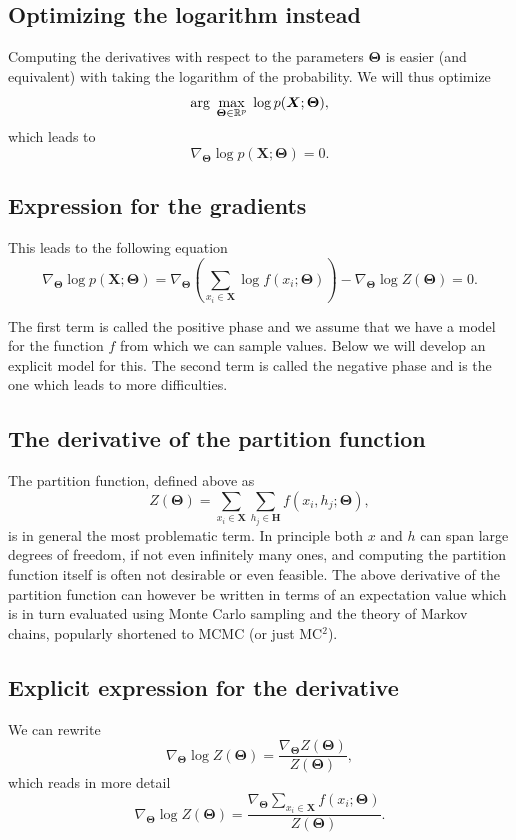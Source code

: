 \documentclass[%
oneside,                 %
final,                   %
10pt]{article}
\begin{document}
\subsection*{Optimizing the logarithm instead}

Computing the derivatives with respect to the parameters $\bm{\Theta}$ is
easier (and equivalent) with taking the logarithm of the
probability. We will thus optimize
\[
{\displaystyle \mathrm{arg} \hspace{0.1cm}\max_{\bm{\bm{\Theta}}\in {\mathbb{R}}^{p}}} \hspace{0.1cm}\log{p(\bm{X};\bm{\Theta})},
\]
which leads to
\[
\nabla_{\bm{\Theta}}\log{p(\bm{X};\bm{\Theta})}=0.
\]

\subsection*{Expression for the gradients}
This leads to the following equation
\[
\nabla_{\bm{\Theta}}\log{p(\bm{X};\bm{\Theta})}=\nabla_{\bm{\Theta}}\left(\sum_{x_i\in \bm{X}}\log{f(x_i;\bm{\Theta})}\right)-\nabla_{\bm{\Theta}}\log{Z(\bm{\Theta})}=0.
\]

The first term is called the positive phase and we assume that we have a model for the function $f$ from which we can sample values. Below we will develop an explicit model for this.
The second term is called the negative phase and is the one which leads to more difficulties.

\subsection*{The derivative of the partition function}

The partition function, defined above as
\[
Z(\bm{\Theta})=\sum_{x_i\in \bm{X}}\sum_{h_j\in \bm{H}} f(x_i,h_j;\bm{\Theta}),
\]
is in general the most problematic term. In principle both $x$ and $h$ can span large degrees of freedom, if not even infinitely many ones, and computing the partition function itself is often not desirable or even feasible. The above derivative of the partition function can however be written in terms of an expectation value which is in turn evaluated  using Monte Carlo sampling and the theory of Markov chains, popularly shortened to MCMC (or just MC$^2$).

\subsection*{Explicit expression for the derivative}
We can rewrite
\[
\nabla_{\bm{\Theta}}\log{Z(\bm{\Theta})}=\frac{\nabla_{\bm{\Theta}}Z(\bm{\Theta})}{Z(\bm{\Theta})},
\]
which reads in more detail
\[
\nabla_{\bm{\Theta}}\log{Z(\bm{\Theta})}=\frac{\nabla_{\bm{\Theta}} \sum_{x_i\in \bm{X}}f(x_i;\bm{\Theta})   }{Z(\bm{\Theta})}.
\]
\end{document}
